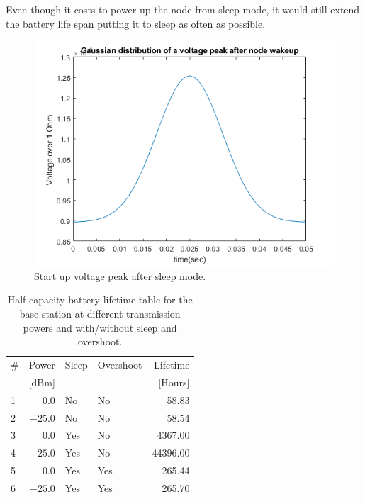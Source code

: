 \noindent Even though it costs to power up the node from sleep mode, it would still extend the battery life span putting it to sleep as often as possible.

\begin{figure}[h]
	\centering
	\includegraphics[width=\linewidth]{theory/energyCalculations/fig/gaussianDistributionsOfVoltagePeak.png}
	\caption{Start up voltage peak after sleep mode.}
	\label{fig:gaussianDistributionsOfVoltagePeak}
\end{figure}

\begin{table}[h]
	\centering
	\begin{tabularx}{\linewidth}{|l|r|l|X|r|}
		\hline
		\#	& Power		& Sleep	& Overshoot	& Lifetime	\\
		    & [dBm]		& 		& 		& [Hours]	\\ \hline
		1	& $0.0$		& No	& No	& 58.83		\\ \hline
		2	& $-25.0$	& No	& No	& 58.54		\\ \hline
		3	& $0.0$		& Yes	& No	& 4367.00	\\ \hline
		4	& $-25.0$	& Yes	& No	& 44396.00	\\ \hline
		5	& $0.0$		& Yes	& Yes	& 265.44	\\ \hline
		6	& $-25.0$	& Yes	& Yes	& 265.70	\\ \hline
	\end{tabularx}
	\caption{Half capacity battery lifetime table for the base station at different transmission powers and with/without sleep and overshoot.}
	\label{tab:halfLifetimeBaseStation}
\end{table}